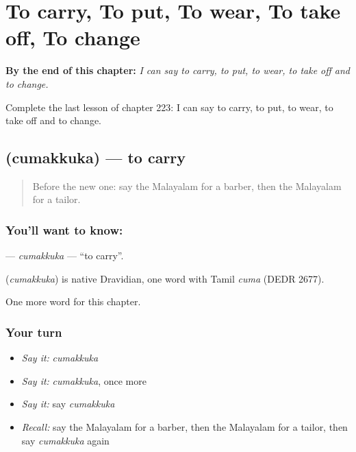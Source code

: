 
\chapter{To carry, To put, To wear, To take off, To change}
\label{ch:ml-to-carry-to-put-to-wear-to-take-off-to-change}

\begin{chapteropening}
\textbf{By the end of this chapter:} \emph{I can say to carry, to put, to wear, to take off and to change.}

Complete the last lesson of chapter 223: I can say to carry, to put, to wear, to take off and to change.
\end{chapteropening}

\section[\texorpdfstring{\ml{ചുമക്കുക} (cumakkuka)}{ചുമക്കുക (cumakkuka)}]{ (cumakkuka) — to carry}

\label{lesson:ML-C223-cumakkuka}



\begin{quote}
Before the new one: say the Malayalam for a barber, then the Malayalam for a tailor.
\end{quote}

\subsection*{You'll want to know: }
\textbf{} — \emph{cumakkuka} — \textquotedblleft{}to carry\textquotedblright{}.

\begin{cousinweb}
\textbf{} (\emph{cumakkuka}) is native Dravidian, one word with Tamil \emph{cuma} (DEDR 2677).
\end{cousinweb}

\begin{grammarlens}[title={What you've built}]
One more word for this chapter.
\end{grammarlens}

\subsection*{Your turn}
\begin{itemize}
\raggedright
  \item \emph{Say it:} \emph{cumakkuka}
  \item \emph{Say it:} \emph{cumakkuka}, once more
  \item \emph{Say it:} say \emph{cumakkuka}
  \item \emph{Recall:} say the Malayalam for a barber, then the Malayalam for a tailor, then say \emph{cumakkuka} again
\end{itemize}

